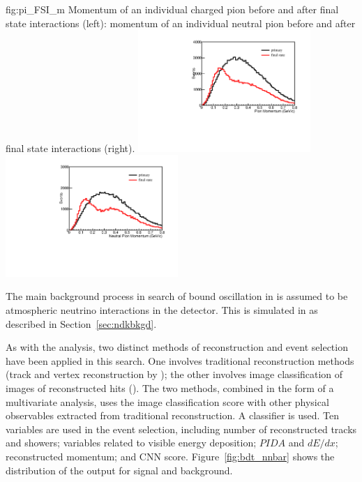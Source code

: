 \begin{dunefigure}
{fig:pi_FSI_m}
{Momentum of an individual charged pion before and after final state interactions (left): momentum of an individual neutral pion before and after final state interactions (right).}
\includegraphics[width=0.49\textwidth]{graphics/pi_mom.pdf}
\includegraphics[width=0.49\textwidth]{graphics/pizero_mom.pdf}
\end{dunefigure} 

The main background process in search of bound \nnbar oscillation in  is assumed to be atmospheric neutrino interactions in the detector.  This is simulated in  as described in Section~\ref{sec:ndkbkgd}.

As with the \ptoknubar analysis, two distinct methods of reconstruction and event selection have been applied in this search. One involves traditional reconstruction methods (\threed track and vertex reconstruction by ); the other involves image classification 
of \twod images of reconstructed hits (). The two methods, combined in the form of a multivariate analysis, uses the image classification score with other physical observables extracted from traditional reconstruction.  A  classifier is used. Ten variables are used in the  event selection, including number of reconstructed tracks and showers; variables related to visible energy deposition; $PIDA$ and $dE/dx$; reconstructed momentum; and CNN score.  Figure~\ref{fig:bdt_nnbar} shows the distribution of the  output for signal and background.

